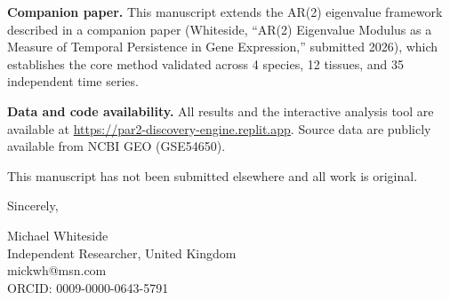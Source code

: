\documentclass[11pt,letterpaper]{article}
\begin{document}
\vspace{0.3cm}

\textbf{Companion paper.} This manuscript extends the AR(2) eigenvalue framework described in a companion paper (Whiteside, ``AR(2) Eigenvalue Modulus as a Measure of Temporal Persistence in Gene Expression,'' submitted 2026), which establishes the core method validated across 4 species, 12 tissues, and 35 independent time series.

\vspace{0.3cm}

\textbf{Data and code availability.} All results and the interactive analysis tool are available at \url{https://par2-discovery-engine.replit.app}. Source data are publicly available from NCBI GEO (GSE54650).

\vspace{0.3cm}

This manuscript has not been submitted elsewhere and all work is original.

\vspace{0.5cm}

Sincerely,

\vspace{0.5cm}

Michael Whiteside \\
Independent Researcher, United Kingdom \\
mickwh@msn.com \\
ORCID: 0009-0000-0643-5791
\end{document}
